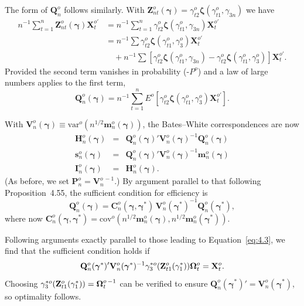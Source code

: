 The form of $\mathbf{Q}_n^o$ follows similarly. With $\mathbf{Z}_{nt}^o(\boldsymbol{\gamma}) = \gamma_{t2}^o\boldsymbol{\zeta}(\gamma_{t1}^o, \gamma_{3n})$ we have
\begin{align*}
n^{-1}\sum_{t=1}^{n}\mathbf{Z}_{nt}^o(\boldsymbol{\gamma})\mathbf{X}_t^{o\prime} &= n^{-1}\sum_{t=1}^{n}\gamma_{t2}^o\boldsymbol{\zeta}(\gamma_{t1}^o, \gamma_{3n})\mathbf{X}_t^{o\prime}\\
&= n^{-1}\sum \gamma_{t2}^o\boldsymbol{\zeta}(\gamma_{t1}^o, \gamma_3^o)\mathbf{X}_t^{o\prime}\\
&\quad + n^{-1}\sum [\gamma_{t2}^o\boldsymbol{\zeta}(\gamma_{t1}^o, \gamma_{3n}) - \gamma_{t2}^o\boldsymbol{\zeta}(\gamma_{t1}^o, \gamma_3^o)]\mathbf{X}_t^{o\prime}.
\end{align*}
Provided the second term vanishes in probability ($\text{-}P^o$) and a law of large
numbers applies to the first term,
\[
\mathbf{Q}_n^o(\boldsymbol{\gamma}) = n^{-1}\sum_{t=1}^{n} E^o[\gamma_{t2}^o\boldsymbol{\zeta}(\gamma_{t1}^o, \gamma_3^o)\mathbf{X}_t^{o\prime}].
\]

With $\mathbf{V}_n^o(\boldsymbol{\gamma}) \equiv \mathrm{var}^o(n^{1/2}\mathbf{m}_n^o(\boldsymbol{\gamma}))$, the Bates--White correspondences are
now
\begin{eqnarray*}
\mathbf{H}_n^o(\boldsymbol{\gamma}) &=& \mathbf{Q}_n^o(\boldsymbol{\gamma})'\mathbf{V}_n^o(\boldsymbol{\gamma})^{-1}\mathbf{Q}_n^o(\boldsymbol{\gamma})\\
\mathbf{s}_n^o(\boldsymbol{\gamma}) &=& \mathbf{Q}_n^o(\boldsymbol{\gamma})'\mathbf{V}_n^o(\boldsymbol{\gamma})^{-1}\mathbf{m}_n^o(\boldsymbol{\gamma})\\
\mathbf{I}_n^o(\boldsymbol{\gamma}) &=& \mathbf{H}_n^o(\boldsymbol{\gamma}).
\end{eqnarray*}
(As before, we set $\mathbf{P}_n^o = \mathbf{V}_n^{o\,-1}$.) By argument parallel to that following
Proposition~4.55, the sufficient condition for efficiency is
\[
\mathbf{Q}_n^o(\boldsymbol{\gamma}) = \mathbf{C}_n^o(\boldsymbol{\gamma}, \boldsymbol{\gamma}^*)\,\mathbf{V}_n^o(\boldsymbol{\gamma}^*)^{-1}\mathbf{Q}_n^o(\boldsymbol{\gamma}^*),
\]
where now $\mathbf{C}_n^o(\boldsymbol{\gamma}, \boldsymbol{\gamma}^*) = \mathrm{cov}^o(n^{1/2}\mathbf{m}_n^o(\boldsymbol{\gamma}), n^{1/2}\mathbf{m}_n^o(\boldsymbol{\gamma}^*))$.

Following arguments exactly parallel to those leading to Equation~\eqref{eq:4.3},
we find that the sufficient condition holds if
\[
\mathbf{Q}_n^o(\boldsymbol{\gamma}^*)'\mathbf{V}_n^o(\boldsymbol{\gamma}^*)^{-1}\gamma_3^{*o}(\mathbf{Z}_{t1}^o(\gamma_1^*))\boldsymbol{\Omega}_t^o = \mathbf{X}_t^o.
\]
Choosing $\gamma_3^{*o}(\mathbf{Z}_{t1}^o(\gamma_1^*)) = \boldsymbol{\Omega}_t^{o\,-1}$ can be verified to ensure
$\mathbf{Q}_n^o(\boldsymbol{\gamma}^*)' = \mathbf{V}_n^o(\boldsymbol{\gamma}^*)$, so optimality follows.

